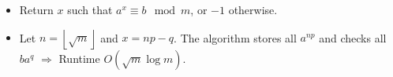 \begin{itemize}
	\item Return $x$ such that $a^x \equiv b \mod m$, or $-1$ otherwise.
	\item Let $n = \left\lfloor \sqrt{m}\right\rfloor$ and $x = np - q$. The algorithm stores all $a^{np}$ and checks all $ba^q$ $\Rightarrow$ Runtime $O\left( \sqrt{m} \log m\right)$.
\end{itemize}
